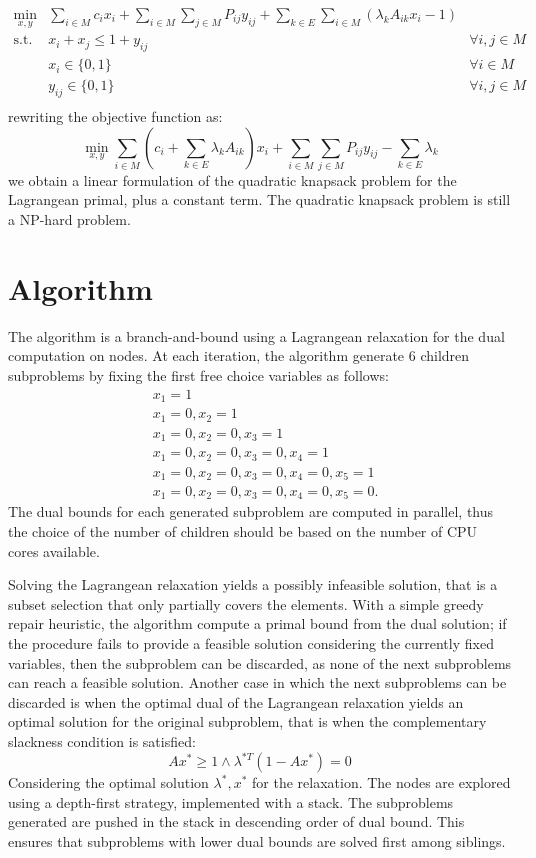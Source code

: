 \documentclass[a4paper]{article}
\begin{document}
\begin{align*}
	\min_{x,y} & \sum_{i\in M} c_i x_i + \sum_{i \in M} \sum_{j \in M} P_{ij} y_{ij} + \sum_{k \in E}\sum_{i\in M} \left(\lambda_k A_{ik} x_i - 1\right)  & \\
	\text{s.t. }
	& x_i + x_j \le 1 + y_{ij} & \forall i,j \in M \\
	& x_i \in \{0, 1\} & \forall i \in M \\
	& y_{ij} \in \{0, 1\} & \forall i,j \in M\\
\end{align*}
rewriting the objective function as:
$$
\min_{x,y} \sum_{i\in M} \left(c_i + \sum_{k \in E} \lambda_k A_{ik}\right) x_i + \sum_{i \in M} \sum_{j \in M} P_{ij} y_{ij} - \sum_{k \in E} \lambda_k
$$
we obtain a linear formulation of the quadratic knapsack problem for the Lagrangean primal, plus a constant term. The quadratic knapsack problem is still a NP-hard problem.

\section{Algorithm}

The algorithm is a branch-and-bound using a Lagrangean relaxation for the dual computation on nodes. At each iteration, the algorithm generate 6 children subproblems by fixing the first free choice variables as follows:
\begin{align*}
&x_1 = 1\\
&x_1 = 0, x_2 = 1\\
&x_1 = 0, x_2 = 0, x_3 = 1\\
&x_1 = 0, x_2 = 0, x_3 = 0, x_4 = 1\\
&x_1 = 0, x_2 = 0, x_3 = 0, x_4 = 0, x_5 = 1\\
&x_1 = 0, x_2 = 0, x_3 = 0, x_4 = 0, x_5 = 0.
\end{align*}
The dual bounds for each generated subproblem are computed in parallel, thus the choice of the number of children should be based on the number of CPU cores available. 

Solving the Lagrangean relaxation yields a possibly infeasible solution, that is a subset selection that only partially covers the elements. With a simple greedy repair heuristic, the algorithm compute a primal bound from the dual solution; if the procedure fails to provide a feasible solution considering the currently fixed variables, then the subproblem can be discarded, as none of the next subproblems can reach a feasible solution. Another case in which the next subproblems can be discarded is when the optimal dual of the Lagrangean relaxation yields an optimal solution for the original subproblem, that is when the complementary slackness condition is satisfied:
$$
Ax^* \ge 1 \wedge \lambda^{*T} (1 - Ax^*) = 0
$$
Considering the optimal solution $\lambda^*, x^*$ for the relaxation. The nodes are explored using a depth-first strategy, implemented with a stack. The subproblems generated are pushed in the stack in descending order of dual bound. This ensures that subproblems with lower dual bounds are solved first among siblings.
\end{document}
